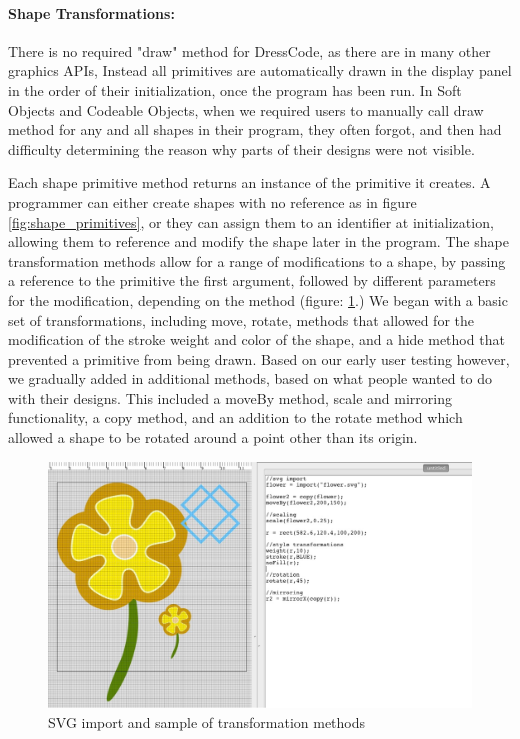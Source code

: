 \paragraph{Shape Transformations:} \label{par:shape_transformation}
There is no required "draw" method for DressCode, as there are in many other graphics APIs, Instead all primitives are automatically drawn in the display panel in the order of their initialization, once the program has been run. In Soft Objects and Codeable Objects, when we required users to manually call draw method for any and all shapes in their program, they often forgot, and then had difficulty determining the reason why parts of their designs were not visible. 

Each shape primitive method returns an instance of the primitive it creates. A programmer can either create shapes with no reference as in figure \ref{fig:shape_primitives}, or they can assign them to an identifier at initialization, allowing them to reference and modify the shape later in the program. The shape transformation methods allow for a range of modifications to a shape, by passing a reference to the primitive the first argument, followed by different parameters for the modification, depending on the method (figure: \ref{fig:transformation}.) We began with a basic set of transformations, including move, rotate, methods that allowed for the modification of the stroke weight and color of the shape, and a hide method that prevented a primitive from being drawn. Based on our early user testing however, we gradually added in additional methods, based on what people wanted to do with their designs. This included a moveBy method, scale and mirroring functionality, a copy method, and an addition to the rotate method which allowed a shape to be rotated around a point other than its origin. 

 \begin{center}
\begin{figure}[h!]
\includegraphics[width=6.5in]{images/transformation.png}
\caption{SVG import and sample of transformation methods}
\label{fig:transformation}
\end{figure}
\end{center} 

